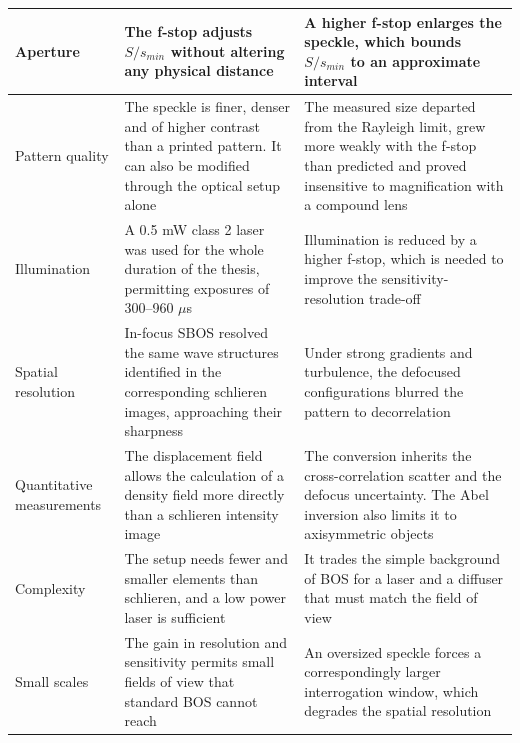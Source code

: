 \begin{table}[htbp]
\begin{tabularx}{\textwidth}{@{}>{\raggedright\arraybackslash}p{} >{\raggedright\arraybackslash}X >{\raggedright\arraybackslash}X@{}}
        Aperture &
        The f-stop adjusts $S/s_{min}$ without altering any physical distance &
        A higher f-stop enlarges the speckle, which bounds $S/s_{min}$ to an approximate interval \\
        \midrule

        Pattern quality &
        The speckle is finer, denser and of higher contrast than a printed pattern. It can also be modified through the optical setup alone&
        The measured size departed from the Rayleigh limit, grew more weakly with the f-stop than predicted and proved insensitive to magnification with a compound lens \\
        \midrule

        Illumination &
        A 0.5 mW class 2 laser was used for the whole duration of the thesis, permitting exposures of 300--960 $\mu$s &
        Illumination is reduced by a higher f-stop, which is needed to improve the sensitivity-resolution trade-off \\
        \midrule

        Spatial resolution &
        In-focus SBOS resolved the same wave structures identified in the corresponding schlieren images, approaching their sharpness &
        Under strong gradients and turbulence, the defocused configurations blurred the pattern to decorrelation \\
        \midrule

        Quantitative measurements &
        The displacement field allows the calculation of a density field more directly than a schlieren intensity image &
        The conversion inherits the cross-correlation scatter and the defocus uncertainty. The Abel inversion also limits it to axisymmetric objects \\
        \midrule

        Complexity &
        The setup needs fewer and smaller elements than schlieren, and a low power laser is sufficient&
        It trades the simple background of BOS for a laser and a diffuser that must match the field of view\\
        \midrule

        Small scales &
        The gain in resolution and sensitivity permits small fields of view that standard BOS cannot reach & An oversized speckle forces a correspondingly larger interrogation window, which degrades the spatial resolution\\
        \bottomrule
    \end{tabularx}
\end{table}

